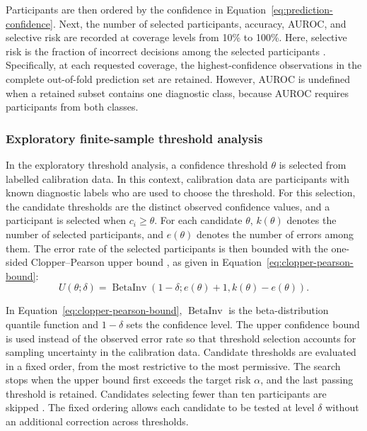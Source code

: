 Participants are then ordered by the confidence in Equation~\eqref{eq:prediction-confidence}. Next, the number
of selected participants, accuracy, AUROC, and selective risk are recorded at coverage
levels from 10\% to 100\%. Here, selective risk is the fraction of incorrect decisions
among the selected participants \citep{GeifmanElYaniv2017}. Specifically, at each requested
coverage, the highest-confidence observations in the complete out-of-fold prediction set
are retained. However, AUROC is undefined when a retained subset contains one diagnostic
class, because AUROC requires participants from both classes.

\subsubsection{Exploratory finite-sample threshold analysis}
\label{subsubsec:threshold-analysis}

In the exploratory threshold analysis, a confidence threshold $\theta$ is selected from
labelled calibration data. In this context, calibration data are participants with known
diagnostic labels who are used to choose the threshold. For this selection, the candidate
thresholds are the distinct observed confidence values, and a participant is selected when
$c_i\geq\theta$. For each candidate $\theta$, $k(\theta)$ denotes the number of selected
participants, and $e(\theta)$ denotes the number of errors among them. The error rate of
the selected participants is then bounded with the one-sided Clopper--Pearson upper bound
\citep{ClopperPearson1934}, as given in Equation~\eqref{eq:clopper-pearson-bound}:
\begin{equation}
U(\theta;\delta)
=
\operatorname{BetaInv}
\left(
1-\delta;
e(\theta)+1,
k(\theta)-e(\theta)
\right).
\label{eq:clopper-pearson-bound}
\end{equation}

In Equation~\eqref{eq:clopper-pearson-bound}, $\operatorname{BetaInv}$ is the beta-distribution quantile
function and $1-\delta$ sets the confidence level. The upper confidence bound is used
instead of the observed error rate so that threshold selection accounts for sampling
uncertainty in the calibration data. Candidate thresholds are evaluated in a fixed order,
from the most restrictive to the most permissive. The search stops when the upper bound
first exceeds the target risk $\alpha$, and the last passing threshold is retained.
Candidates selecting fewer than ten participants are skipped
\citep{Angelopoulosetal2021,AngelopoulosBates2023}. The fixed ordering allows each
candidate to be tested at level $\delta$ without an additional correction across
thresholds.

